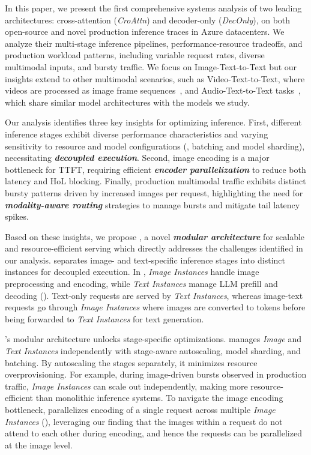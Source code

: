 In this paper, we present the first comprehensive systems analysis of two leading \lmm{} architectures:
cross-attention (\emph{CroAttn}) and decoder-only (\emph{DecOnly}), on both open-source \lmms{} and novel production \lmm{} inference traces in Azure datacenters.
We analyze their multi-stage inference pipelines, performance-resource tradeoffs, and production workload patterns, including variable request rates, diverse multimodal inputs, and bursty traffic.
We focus on Image-Text-to-Text but our insights extend to other multimodal scenarios, such as Video-Text-to-Text, where videos are processed as image frame sequences~\cite{llava-ov}, and Audio-Text-to-Text tasks~\cite{attt}, which share similar model architectures with the models we study.

Our analysis identifies three key insights for optimizing \lmm{} inference.
First, different \lmm{} inference stages exhibit diverse performance characteristics and varying sensitivity to resource and model configurations (\eg{}, batching and model sharding), necessitating \emph{\textbf{decoupled execution}}.
Second, image encoding is a major bottleneck for TTFT, requiring efficient \emph{\textbf{encoder parallelization}} to reduce both latency and HoL blocking.
Finally, production multimodal traffic exhibits distinct bursty patterns driven by increased images per request, highlighting the need for \emph{\textbf{modality-aware routing}} strategies to manage bursts and mitigate tail latency spikes.

Based on these insights, we propose \sysname{}, a novel \textit{\textbf{modular architecture}} for scalable and resource-efficient \lmm{} serving which directly addresses the challenges identified in our analysis.
\sysname{} separates image- and text-specific inference stages into distinct instances for decoupled execution.
In \sysname{}, \emph{Image Instances} handle image preprocessing and encoding, while \emph{Text Instances} manage LLM prefill and decoding ().
Text-only requests are served by \emph{Text Instances}, whereas image-text requests go through \emph{Image Instances} where images are converted to tokens before being forwarded to \emph{Text Instances} for text generation.

\sysname{}'s modular architecture unlocks stage-specific optimizations. \sysname{} manages \emph{Image} and \emph{Text Instances} independently with stage-aware autoscaling, model sharding, and batching.
By autoscaling the stages separately, it minimizes resource overprovisioning.
For example, during image-driven bursts observed in production traffic, \emph{Image Instances} can scale out independently, making \sysname{} more resource-efficient than monolithic inference systems.
To navigate the image encoding bottleneck, \sysname{} parallelizes encoding of a single request across multiple \emph{Image Instances} (), leveraging our finding that the images within a request do not attend to each other during encoding, and hence the requests can be parallelized at the image level.

